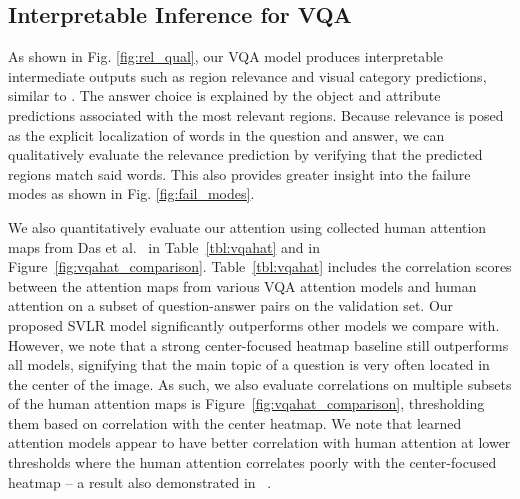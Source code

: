 


\subsection{Interpretable Inference for VQA}
As shown in Fig. \ref{fig:rel_qual}, our VQA model produces interpretable intermediate outputs such as region relevance and visual category predictions, similar to \cite{tommasi2016bmvc}. The answer choice is explained by the object and attribute predictions associated with the most relevant regions. Because relevance is posed as the explicit localization of words in the question and answer, we can qualitatively evaluate the relevance prediction by verifying that the predicted regions match said words. This also provides greater insight into the failure modes as shown in Fig. \ref{fig:fail_modes}. 

We also quantitatively evaluate our attention using collected human attention maps from Das et al.~\cite{das2016human} in Table~\ref{tbl:vqahat} and in Figure~\ref{fig:vqahat_comparison}. Table~\ref{tbl:vqahat} includes the correlation scores between the attention maps from various VQA attention models and human attention on a subset of question-answer pairs on the validation set. Our proposed SVLR model significantly outperforms other models we compare with. However, we note that a strong center-focused heatmap baseline still outperforms all models, signifying that the main topic of a question is very often located in the center of the image. As such, we also evaluate correlations on multiple subsets of the human attention maps is Figure~\ref{fig:vqahat_comparison}, thresholding them based on correlation with the center heatmap. We note that learned attention models appear to have better correlation with human attention at lower thresholds where the human attention correlates poorly with the center-focused heatmap -- a result also demonstrated in ~\cite{das2016human}.

